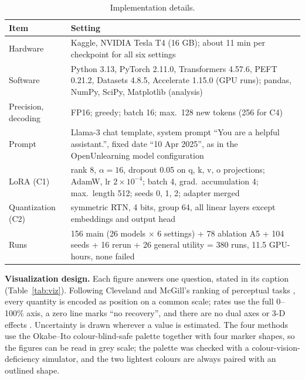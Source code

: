\documentclass[conference]{IEEEtran}
\begin{document}
\begin{table}[t]
\caption{Implementation details.}
\label{tab:setup}
\centering
\scriptsize
\setlength{\tabcolsep}{2.5pt}
\begin{tabular}{@{}L{1.6cm}L{6.25cm}@{}}
\toprule
Item & Setting \\
\midrule
Hardware & Kaggle, NVIDIA Tesla T4 (16 GB); about 11 min per checkpoint for all six settings \\
Software & Python 3.13, PyTorch 2.11.0, Transformers 4.57.6, PEFT 0.21.2, Datasets 4.8.5, Accelerate 1.15.0 (GPU runs); pandas, NumPy, SciPy, Matplotlib (analysis) \\
Precision, decoding & FP16; greedy; batch 16; max.\ 128 new tokens (256 for C4) \\
Prompt & Llama-3 chat template, system prompt ``You are a helpful assistant.'', fixed date ``10 Apr 2025'', as in the OpenUnlearning model configuration \\
LoRA (C1) & rank 8, $\alpha=16$, dropout 0.05 on q, k, v, o projections; AdamW, lr $2\times10^{-4}$; batch 4, grad.\ accumulation 4; max.\ length 512; seeds 0, 1, 2; adapter merged \\
Quantization (C2) & symmetric RTN, 4 bits, group 64, all linear layers except embeddings and output head \\
Runs & 156 main (26 models $\times$ 6 settings) + 78 ablation A5 + 104 seeds + 16 rerun + 26 general utility = 380 runs, 11.5 GPU-hours, none failed \\
\bottomrule
\end{tabular}
\end{table}

\textbf{Visualization design.} Each figure answers one question, stated in its caption (Table~\ref{tab:viz}). Following Cleveland and McGill's ranking of perceptual tasks \cite{cleveland1984graphical}, every quantity is encoded as position on a common scale; rates use the full 0--100\% axis, a zero line marks ``no recovery'', and there are no dual axes or 3-D effects \cite{tufte2001visual}. Uncertainty is drawn wherever a value is estimated. The four methods use the Okabe--Ito colour-blind-safe palette \cite{wong2011color} together with four marker shapes, so the figures can be read in grey scale; the palette was checked with a colour-vision-deficiency simulator, and the two lightest colours are always paired with an outlined shape.
\end{document}

